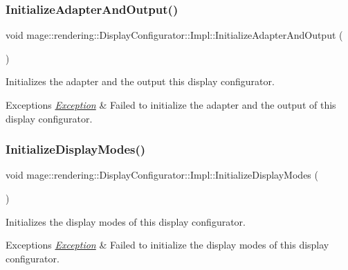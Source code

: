 \subsubsection{\texorpdfstring{Initialize\+Adapter\+And\+Output()}{InitializeAdapterAndOutput()}}
{\footnotesize\ttfamily void mage\+::rendering\+::\+Display\+Configurator\+::\+Impl\+::\+Initialize\+Adapter\+And\+Output (\begin{DoxyParamCaption}{ }\end{DoxyParamCaption})\hspace{0.3cm}{\ttfamily [private]}}

Initializes the adapter and the output this display configurator.


\begin{DoxyExceptions}{Exceptions}
{\em \mbox{\hyperlink{classmage_1_1_exception}{Exception}}} & Failed to initialize the adapter and the output of this display configurator. \\
\hline
\end{DoxyExceptions}
\mbox{\label{classmage_1_1rendering_1_1_display_configurator_1_1_impl_a1fe26330e7c488af6fbe8f0c4a8c3286}} 
\subsubsection{\texorpdfstring{Initialize\+Display\+Modes()}{InitializeDisplayModes()}}
{\footnotesize\ttfamily void mage\+::rendering\+::\+Display\+Configurator\+::\+Impl\+::\+Initialize\+Display\+Modes (\begin{DoxyParamCaption}{ }\end{DoxyParamCaption})\hspace{0.3cm}{\ttfamily [private]}}

Initializes the display modes of this display configurator.


\begin{DoxyExceptions}{Exceptions}
{\em \mbox{\hyperlink{classmage_1_1_exception}{Exception}}} & Failed to initialize the display modes of this display configurator. \\
\hline
\end{DoxyExceptions}
\mbox{\label{classmage_1_1rendering_1_1_display_configurator_1_1_impl_afaffb2c4689dd48c195d2a7f12c11e0b}} 
